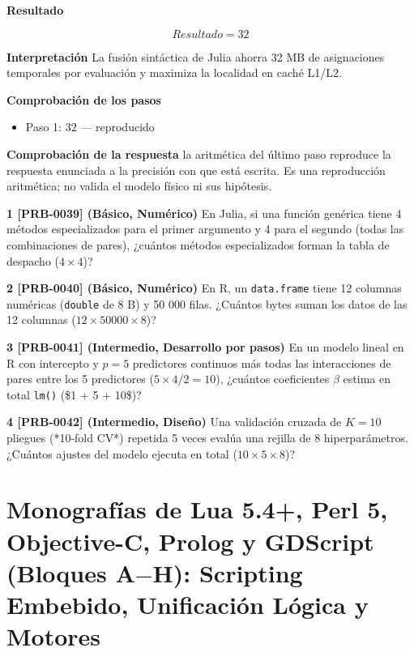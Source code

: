\documentclass{book}
\begin{document}
\begin{tcolorbox}[title={Problema resuelto}, studiumworked, breakable]
\noindent\textbf{Resultado}

\[
Resultado = 32
\]

\noindent\textbf{Interpretación}
La fusión sintáctica de Julia ahorra 32 MB de asignaciones temporales por evaluación y maximiza la localidad en caché L1/L2.

\noindent\textbf{Comprobación de los pasos}
\begin{itemize}
\item Paso 1: $32$ — reproducido
\end{itemize}

\noindent\textbf{Comprobación de la respuesta} la aritmética del último paso reproduce la respuesta enunciada a la precisión con que está escrita. Es una reproducción aritmética; no valida el modelo físico ni sus hipótesis.
\end{tcolorbox}

\begin{tcolorbox}[title={Ejercicios}, studiumworked, breakable]

\noindent\textbf{1 [PRB-0039] (Básico, Numérico)}
En Julia, si una función genérica tiene 4 métodos especializados para el primer argumento y 4 para el segundo (todas las combinaciones de pares), ¿cuántos métodos especializados forman la tabla de despacho (\(4 \times 4\))?

\noindent\textbf{2 [PRB-0040] (Básico, Numérico)}
En R, un \texttt{data.frame} tiene 12 columnas numéricas (\texttt{double} de 8 B) y 50 000 filas. ¿Cuántos bytes suman los datos de las 12 columnas (\(12 \times 50000 \times 8\))?

\noindent\textbf{3 [PRB-0041] (Intermedio, Desarrollo por pasos)}
En un modelo lineal en R con intercepto y \(p = 5\) predictores continuos más todas las interacciones de pares entre los 5 predictores (\(5 \times 4 / 2 = 10\)), ¿cuántos coeficientes \(\beta\) estima en total \texttt{lm()} (\$1 + 5 + 10\$)?

\noindent\textbf{4 [PRB-0042] (Intermedio, Diseño)}
Una validación cruzada de \(K = 10\) pliegues (*10-fold CV*) repetida 5 veces evalúa una rejilla de 8 hiperparámetros. ¿Cuántos ajustes del modelo ejecuta en total (\(10 \times 5 \times 8\))?
\end{tcolorbox}

\chapter{Monografías de Lua 5.4+, Perl 5, Objective-C, Prolog y GDScript (Bloques A\(-\)H): Scripting Embebido, Unificación Lógica y Motores}
\label{chap:cap08-monografias-lua-perl-objc-prolog-gdscript}
\end{document}
